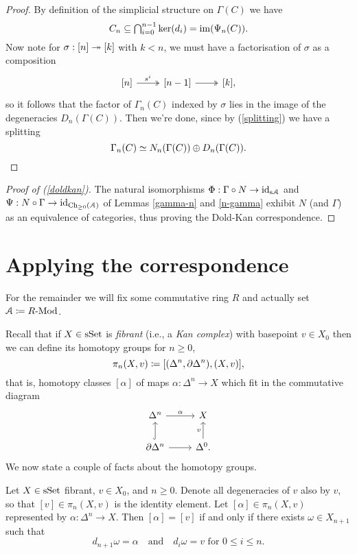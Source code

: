 \begin{proof}
  By definition of the simplicial structure on $\Gamma(C)$ we have
  \[
  \textstyle{C_n \subseteq \bigcap_{i=0}^{n-1} \ker(d_i) =
    \operatorname{im}(\Psi_n(C))}.
  \]
  Now note for $\sigma : [n] \twoheadrightarrow [k]$ with $k < n$, we must have a
  factorisation of $\sigma$ as a composition
  \[
  \begin{tikzcd}
    {[n]} \ar[twoheadrightarrow]{r}{s^i} & {[n-1]}
    \ar[twoheadrightarrow]{r} & {[k]},
  \end{tikzcd}
  \]
  so it follows that the factor of $\Gamma_n(C)$ indexed by $\sigma$
  lies in the image of the degeneracies $D_n(\Gamma(C))$. Then we're
  done, since by (\ref{splitting}) we have a splitting
  \[
  \Gamma_n(C) \simeq N_n(\Gamma(C)) \oplus D_n(\Gamma(C)). \qedhere
  \]
\end{proof}

\begin{proof}[Proof of (\ref{doldkan})]
  The natural isomorphisms $\Phi : \Gamma \circ N \to \mathrm{id}_{\mathrm{s}\mathcal{A}}$ and
  $\Psi : N \circ \Gamma \to \mathrm{id}_{\mathrm{Ch}_{\ge 0}(\mathcal{A})}$ of Lemmas
  \ref{gamma-n} and \ref{n-gamma} exhibit $N$ (and $\Gamma$) as an
  equivalence of categories, thus proving the Dold-Kan correspondence.
\end{proof}


\section{Applying the correspondence}

For the remainder we will fix some commutative ring $R$ and actually
set $\mathcal{A} \coloneqq R\text{-}\mathrm{Mod}$.

\medskip
Recall that if $X \in \mathrm{s}\mathrm{Set}$ is \textit{fibrant} (i.e., a \textit{Kan
  complex}) with basepoint $v \in X_0$ then we can define its homotopy
groups for $n \ge 0$,
\[
\pi_n(X,v) \coloneqq [(\Delta^n, \partial\Delta^n), (X,v)],
\]
that is, homotopy classes $[\alpha]$ of maps $\alpha : \Delta^n \to X$
which fit in the commutative diagram
\[
\begin{tikzcd}
  \Delta^n \rar{\alpha} & X \\ \del\Delta^n \ar[hookrightarrow]{u} \rar
    & \Delta^0 \uar{v}.
\end{tikzcd}
\]
We now state a couple of facts about the homotopy groups.

\begin{lemma}
  \label{null-homotopic}
  Let $X \in \mathrm{s}\mathrm{Set}$ fibrant, $v \in X_0$, and $n \ge 0$. Denote all
  degeneracies of $v$ also by $v$, so that $[v] \in \pi_n(X,v)$ is the
  identity element. Let $[\alpha] \in \pi_n(X,v)$ represented by
  $\alpha : \Delta^n \to X$. Then $[\alpha] = [v]$ if and only if
  there exists $\omega \in X_{n+1}$ such that
  \[
  d_{n+1}\omega = \alpha \quad\text{and}\quad d_i\omega = v\text{ for
  } 0 \le i \le n.
  \]
\end{lemma}

